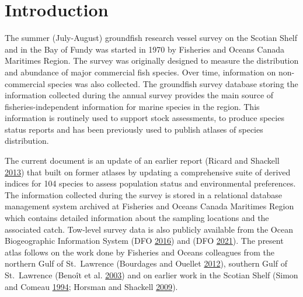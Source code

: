 \documentclass[12pt]{article}\usepackage[]{graphicx}\usepackage[]{color}
\begin{document}

\frontmatter


\renewcommand{\headrulewidth}{0.5pt}  %
\renewcommand{\footrulewidth}{0.5pt}  %

\newcommand{\lt}{\ensuremath <}
\newcommand{\gt}{\ensuremath >}


\hypertarget{sec:introduction}{%
\section{Introduction}\label{sec:introduction}}

The summer (July-August) groundfish research vessel survey on the Scotian Shelf and in the Bay of Fundy was started in 1970 by Fisheries and Oceans Canada Maritimes Region. The survey was originally designed to measure the distribution and abundance of major commercial fish species. Over time, information on non-commercial species was also collected. The groundfish survey database storing the information collected during the annual survey provides the main source of fisheries-independent information for marine species in the region. This information is routinely used to support stock assessments, to produce species status reports and has been previously used to publish atlases of species distribution.

The current document is an update of an earlier report (Ricard and Shackell \protect\hyperlink{ref-Ricard:MARatlas:2013}{2013}) that built on former atlases by updating a comprehensive suite of derived indices for 104 species to assess population status and environmental preferences. The information collected during the survey is stored in a relational database management system archived at Fisheries and Oceans Canada Maritimes Region which contains detailed information about the sampling locations and the associated catch. Tow-level survey data is also publicly available from the Ocean Biogeographic Information System (DFO \protect\hyperlink{ref-DFO:2016}{2016}) and (DFO \protect\hyperlink{ref-OpenData_MAR_RV}{2021}). The present atlas follows on the work done by Fisheries and Oceans colleagues from the northern Gulf of St.~Lawrence (Bourdages and Ouellet \protect\hyperlink{ref-Bourdages:NGatlas:2012}{2012}), southern Gulf of St.~Lawrence (Benoît et al. \protect\hyperlink{ref-Benoit:etal:2003:techreport}{2003}) and on earlier work in the Scotian Shelf (Simon and Comeau \protect\hyperlink{ref-Simon:Comeau:1994}{1994}; Horsman and Shackell \protect\hyperlink{ref-Horsman:atlas:2009}{2009}).
\end{document}
